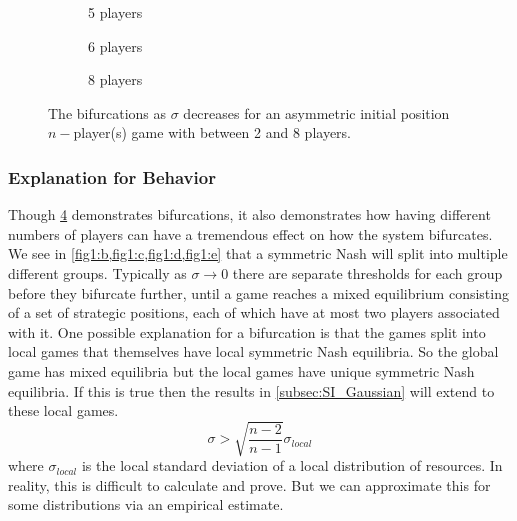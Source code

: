 \documentclass{article}
\begin{document}
\begin{figure}[ht!]
                
                \begin{subfigure}[b]{0.3\linewidth}
                    \centering
                     
                    \caption{5 players }  
                    \label{fig1:e} 
                    \vspace{4ex}
                \end{subfigure}
                \begin{subfigure}[b]{0.3\linewidth}
                    \centering
                     
                    \caption{6 players} 
                    \label{fig1:f} 
                    \vspace{4ex}
                \end{subfigure}
                \begin{subfigure}[b]{0.3\linewidth}
                    \centering
                     
                    \caption{8 players } 
                    \label{fig1:g}
                    \vspace{4ex}
                \end{subfigure} 
                \caption{The bifurcations as $\sigma$ decreases for an asymmetric initial position $n-$player(s) game with between 2 and 8 players.}
                \label{fig1} 
            \end{figure}
            \clearpage




            
            \subsubsection{Explanation for Behavior} 
                Though \cref{fig1} demonstrates bifurcations, it also demonstrates how having different numbers of players can have a tremendous effect on how the system bifurcates. We see in \cref{fig1:b,fig1:c,fig1:d,fig1:e} that a symmetric Nash will split into multiple different groups. Typically as $\sigma \to 0$ there are separate thresholds for each group before they bifurcate further, until a game reaches a mixed equilibrium consisting of a set of strategic positions, each of which have at most two players associated with it. One possible explanation for a bifurcation is that the games split into local games that themselves have local symmetric Nash equilibria. So the global game has mixed equilibria but the local games have unique symmetric Nash equilibria. If this is true then the results in \cref{subsec:SI_Gaussian} will extend to these local games. 
                \begin{equation}
                    \sigma>\sqrt{\frac{n-2}{n-1}} \sigma_{local}
                \end{equation}
                where $\sigma_{local}$ is the local standard deviation of a local distribution of resources. In reality, this is difficult to calculate and prove. But we can approximate this for some distributions via an empirical estimate.
                
\end{document}

